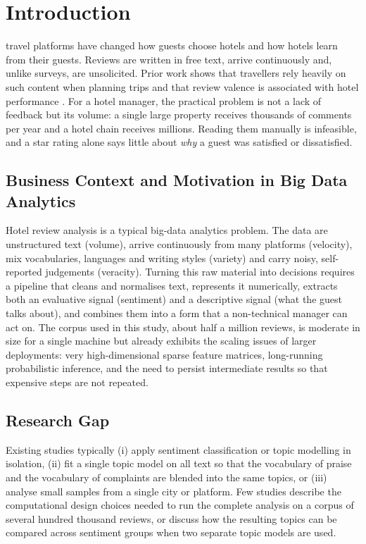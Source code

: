 \documentclass[11pt,journal,draftclsnofoot,onecolumn]{IEEEtran}
\begin{document}
\section{Introduction}
 travel platforms have changed how guests choose hotels and how hotels learn from their guests. Reviews are written in free text, arrive continuously and, unlike surveys, are unsolicited. Prior work shows that travellers rely heavily on such content when planning trips \cite{xiang2010} and that review valence is associated with hotel performance \cite{ye2009}. For a hotel manager, the practical problem is not a lack of feedback but its volume: a single large property receives thousands of comments per year and a hotel chain receives millions. Reading them manually is infeasible, and a star rating alone says little about \emph{why} a guest was satisfied or dissatisfied.

\subsection{Business Context and Motivation in Big Data Analytics}
Hotel review analysis is a typical big-data analytics problem. The data are unstructured text (volume), arrive continuously from many platforms (velocity), mix vocabularies, languages and writing styles (variety) and carry noisy, self-reported judgements (veracity). Turning this raw material into decisions requires a pipeline that cleans and normalises text, represents it numerically, extracts both an evaluative signal (sentiment) and a descriptive signal (what the guest talks about), and combines them into a form that a non-technical manager can act on. The corpus used in this study, about half a million reviews, is moderate in size for a single machine but already exhibits the scaling issues of larger deployments: very high-dimensional sparse feature matrices, long-running probabilistic inference, and the need to persist intermediate results so that expensive steps are not repeated.

\subsection{Research Gap}
Existing studies typically (i) apply sentiment classification or topic modelling in isolation, (ii) fit a single topic model on all text so that the vocabulary of praise and the vocabulary of complaints are blended into the same topics, or (iii) analyse small samples from a single city or platform. Few studies describe the computational design choices needed to run the complete analysis on a corpus of several hundred thousand reviews, or discuss how the resulting topics can be compared across sentiment groups when two separate topic models are used.
\end{document}
